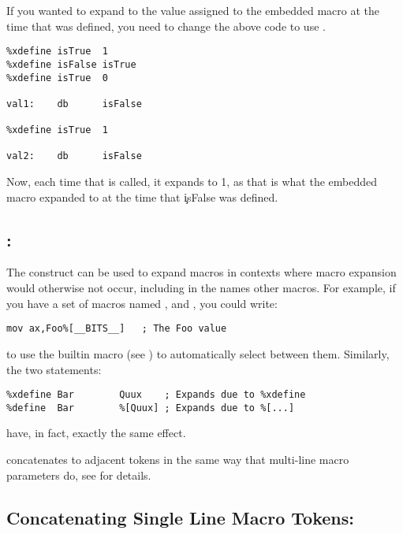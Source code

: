If you wanted  to expand to the value assigned to the
embedded macro  at the time that  was defined,
you need to change the above code to use .

\begin{lstlisting}
%xdefine isTrue  1
%xdefine isFalse isTrue
%xdefine isTrue  0

val1:    db      isFalse

%xdefine isTrue  1

val2:    db      isFalse
\end{lstlisting}

Now, each time that  is called, it expands to 1,
as that is what the embedded macro  expanded to at
the time that \c{isFalse} was defined.

\subsection{: \indexcode{\%[}\code{\%[...]}}
\label{subsec:indmacro}

The \code{\%[...]} construct can be used to expand macros in contexts
where macro expansion would otherwise not occur, including in the
names other macros. For example, if you have a set of macros named
,  and , you could write:

\begin{lstlisting}
mov ax,Foo%[__BITS__]	; The Foo value
\end{lstlisting}

to use the builtin macro  (see )
to automatically select between them. Similarly, the two statements:

\begin{lstlisting}
%xdefine Bar		Quux	; Expands due to %xdefine
%define  Bar		%[Quux]	; Expands due to %[...]
\end{lstlisting}

have, in fact, exactly the same effect.

\code{\%[...]} concatenates to adjacent tokens in the same way that
multi-line macro parameters do, see  for details.

\subsection{Concatenating Single Line Macro Tokens: \codeindex{\%+}}
\label{subsec:concat_macro}

